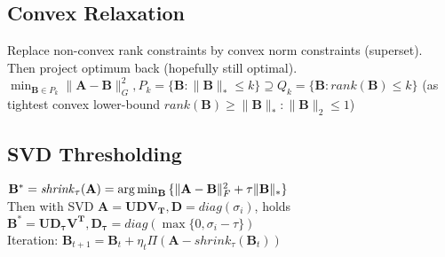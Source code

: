 \subsection*{Convex Relaxation}
Replace non-convex rank constraints by convex norm constraints (superset). Then project optimum back (hopefully still optimal).\\
$\min_{\mathbf{B}\in P_k}{\|\mathbf{A-B}\|^2_G}, P_k=\{\mathbf{B}:\|\mathbf{B}\|_{*}\leq k\}\supseteq Q_k=\{\mathbf{B}:\mathit{rank}(\mathbf{B})\leq k\}$ (as tightest convex lower-bound $\mathit{rank}(\mathbf{B})\geq \|\mathbf{B}\|_{*} : \|\mathbf{B}\|_2 \leq 1$)

\subsection*{SVD Thresholding}
$\mathbf{B}^{*}=\mathit{shrink}_\tau(\mathbf{A})=\operatorname*{arg\,min}_{\mathbf{B}}{\{\|\mathbf{A-B}\|^2_F + \tau\|\mathbf{B}\|_{*}\}}$\\
Then with SVD $\mathbf{A=UDV_T}, \mathbf{D}=\mathit{diag}(\sigma_i)$, holds $\mathbf{B^*=UD_\tau V^T, D_\tau} = \mathit{diag}(\max\{0,\sigma_i - \tau\})$ \\
Iteration: $\mathbf{B}_{t+1}=\mathbf{B}_t + \eta_t \Pi(\mathbf{A} - \mathit{shrink}_\tau(\mathbf{B}_t))$